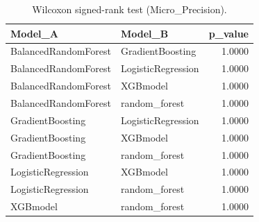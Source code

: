 \begin{table}[t]
\centering
\begin{tabular}{llr}
\toprule
Model_A & Model_B & p_value \\
\midrule
BalancedRandomForest & GradientBoosting & 1.0000 \\
BalancedRandomForest & LogisticRegression & 1.0000 \\
BalancedRandomForest & XGBmodel & 1.0000 \\
BalancedRandomForest & random_forest & 1.0000 \\
GradientBoosting & LogisticRegression & 1.0000 \\
GradientBoosting & XGBmodel & 1.0000 \\
GradientBoosting & random_forest & 1.0000 \\
LogisticRegression & XGBmodel & 1.0000 \\
LogisticRegression & random_forest & 1.0000 \\
XGBmodel & random_forest & 1.0000 \\
\bottomrule
\end{tabular}
\caption{Wilcoxon signed-rank test (Micro_Precision).}
\label{tab:wilcoxon_Micro_Precision}
\end{table}